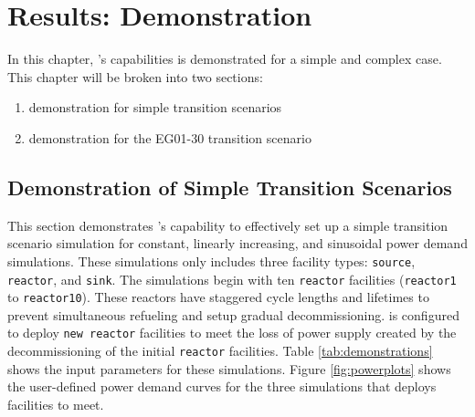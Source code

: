 \chapter{Results: \deploy Demonstration}
In this chapter, \deploy's capabilities is demonstrated 
for a simple and complex case.  
This chapter will be broken into two sections: 
\begin{enumerate}
    \item \deploy demonstration for simple transition scenarios
    \item \deploy demonstration for the EG01-30 transition scenario
\end{enumerate}

\section{\deploy Demonstration of Simple Transition Scenarios}
\label{sec:demo}

This section demonstrates \deploy's capability 
to effectively set up a simple transition scenario simulation 
for constant, linearly increasing, and 
sinusoidal power demand simulations.
These simulations only includes
three facility types: \texttt{source}, \texttt{reactor}, and 
\texttt{sink}. 
The simulations begin with ten \texttt{reactor} facilities 
(\texttt{reactor1} to \texttt{reactor10}). 
These reactors have staggered cycle lengths and lifetimes to prevent 
simultaneous refueling and setup gradual decommissioning. 
\deploy is configured to deploy \texttt{new reactor} facilities
to meet the loss of power supply created by the decommissioning 
of the initial \texttt{reactor} facilities. 
Table \ref{tab:demonstrations} shows the 
\deploy input parameters for these simulations.
Figure \ref{fig:powerplots} shows the user-defined power demand curves 
for the three simulations that \deploy deploys facilities to meet.

